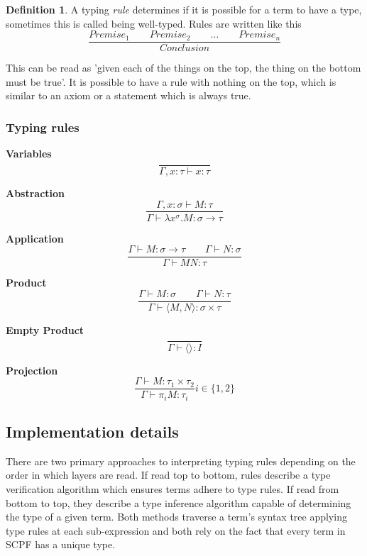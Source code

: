 \documentclass[12pt,a4paper]{report}
\theoremstyle{definition}
\newtheorem{definition}{Definition}[chapter]%
\theoremstyle{remark}
\begin{document}
\begin{definition}
    A typing \emph{rule} determines if it is possible for a term to have a type, sometimes this is called being well-typed. Rules are written like this
    \[
    \frac{Premise_1 \quad\quad Premise_2 \quad\quad \ldots \quad\quad Premise_n}{Conclusion}
    \]

    This can be read as 'given each of the things on the top, the thing on the bottom must be true'. It is possible to have a rule with nothing on the top, which is similar to an axiom or a statement which is always true.
\end{definition}

\subsubsection{Typing rules} \label{section: type rules}

\textbf{Variables}
\begin{equation}
    \frac{}{\Gamma, x:\tau \vdash x: \tau}
\end{equation}

\textbf{Abstraction}
\begin{equation}
    \frac{\Gamma, x:\sigma \vdash M : \tau}{\Gamma \vdash \lambda x^{\sigma}. M : \sigma \rightarrow \tau}
\end{equation}

\textbf{Application}
\begin{equation}
    \frac{\Gamma \vdash M : \sigma \rightarrow \tau \quad\quad \Gamma \vdash N : \sigma}{\Gamma \vdash MN : \tau}
\end{equation}

\textbf{Product}
\begin{equation}
    \frac{\Gamma \vdash M:\sigma \quad\quad \Gamma \vdash N:\tau}{\Gamma \vdash \langle M,N \rangle : \sigma \times \tau}
\end{equation}

\textbf{Empty Product}
\begin{equation}
    \frac{}{\Gamma \vdash \langle \rangle : I}
\end{equation}

\textbf{Projection}
\begin{equation}
    \frac{\Gamma \vdash M:\tau_1 \times \tau_2}{\Gamma \vdash \pi_i M: \tau_i} i \in \{1, 2\}
\end{equation}

\subsection{Implementation details} 
There are two primary approaches to interpreting typing rules depending on the order in which layers are read. If read top to bottom, rules describe a type verification algorithm which ensures terms adhere to type rules. If read from bottom to top, they describe a type inference algorithm capable of determining the type of a given term. Both methods traverse a term's syntax tree applying type rules at each sub-expression and both rely on the fact that every term in SCPF has a unique type.
\end{document}
